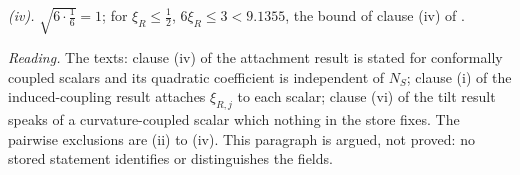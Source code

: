 \emph{(iv).} $\sqrt{6\cdot\tfrac16} = 1$; for $\xi_{R} \le \tfrac12$, $6\xi_{R} \le 3 < 9.1355$, the bound of clause (iv) of .

\emph{Reading.} The texts: clause (iv) of the attachment result is stated for conformally coupled scalars and its quadratic coefficient is independent of $N_{S}$; clause (i) of the induced-coupling result attaches $\xi_{R,j}$ to each scalar; clause (vi) of the tilt result speaks of a curvature-coupled scalar which nothing in the store fixes. The pairwise exclusions are (ii) to (iv). This paragraph is argued, not proved: no stored statement identifies or distinguishes the fields.
